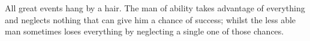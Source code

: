 
%


        
\begin{ntquote}
  All great events hang by a hair. The man of ability takes advantage of everything and neglects nothing that can give him a chance of success; whilst the less able man sometimes loses everything by neglecting a single one of those chances.
\end{ntquote}

